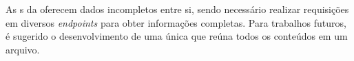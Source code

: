 \documentclass[
	12pt,				%
	oneside,			%
	a4paper,			%
	chapter=TITLE,		%
	section=TITLE,		%
	english,			%
	brazil				%
	]{abntex2}
\begin{document}
As s da  oferecem dados incompletos entre si, sendo necessário realizar requisições em diversos \textit{endpoints} para obter informações completas. Para trabalhos futuros, é sugerido o desenvolvimento de uma única  que reúna todos os conteúdos em um arquivo.

\postextual

\begingroup
    \SingleSpacing\printbibliography[title=REFERÊNCIAS]
\endgroup

%
%


%	



%	

\end{document}
